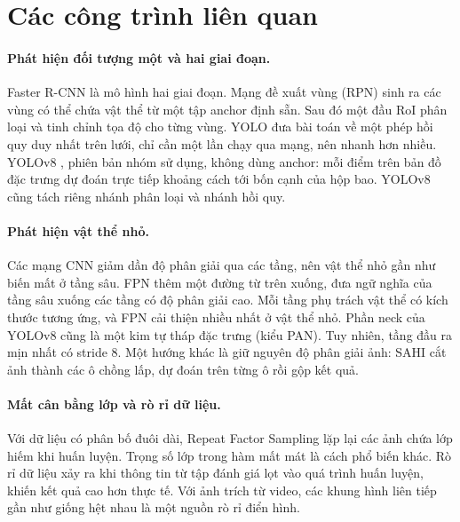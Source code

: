 
\section{Các công trình liên quan}
\label{sec:related}

\paragraph{Phát hiện đối tượng một và hai giai đoạn.}
Faster R-CNN \citep{ren2015faster} là mô hình hai giai đoạn. Mạng đề xuất vùng (RPN) sinh ra các vùng có thể chứa vật thể từ một tập anchor định sẵn. Sau đó một đầu RoI phân loại và tinh chỉnh tọa độ cho từng vùng.
YOLO \citep{redmon2016yolo} đưa bài toán về một phép hồi quy duy nhất trên lưới, chỉ cần một lần chạy qua mạng, nên nhanh hơn nhiều.
YOLOv8 \citep{jocher2023ultralytics}, phiên bản nhóm sử dụng, không dùng anchor: mỗi điểm trên bản đồ đặc trưng dự đoán trực tiếp khoảng cách tới bốn cạnh của hộp bao. YOLOv8 cũng tách riêng nhánh phân loại và nhánh hồi quy.

\paragraph{Phát hiện vật thể nhỏ.}
Các mạng CNN giảm dần độ phân giải qua các tầng, nên vật thể nhỏ gần như biến mất ở tầng sâu.
FPN \citep{lin2017fpn} thêm một đường từ trên xuống, đưa ngữ nghĩa của tầng sâu xuống các tầng có độ phân giải cao. Mỗi tầng phụ trách vật thể có kích thước tương ứng, và FPN cải thiện nhiều nhất ở vật thể nhỏ.
Phần neck của YOLOv8 cũng là một kim tự tháp đặc trưng (kiểu PAN). Tuy nhiên, tầng đầu ra mịn nhất có stride 8.
Một hướng khác là giữ nguyên độ phân giải ảnh: SAHI \citep{akyon2022sahi} cắt ảnh thành các ô chồng lấp, dự đoán trên từng ô rồi gộp kết quả.

\paragraph{Mất cân bằng lớp và rò rỉ dữ liệu.}
Với dữ liệu có phân bố đuôi dài, Repeat Factor Sampling \citep{gupta2019lvis} lặp lại các ảnh chứa lớp hiếm khi huấn luyện. Trọng số lớp trong hàm mất mát là cách phổ biến khác.
Rò rỉ dữ liệu xảy ra khi thông tin từ tập đánh giá lọt vào quá trình huấn luyện, khiến kết quả cao hơn thực tế. Với ảnh trích từ video, các khung hình liên tiếp gần như giống hệt nhau là một nguồn rò rỉ điển hình.
